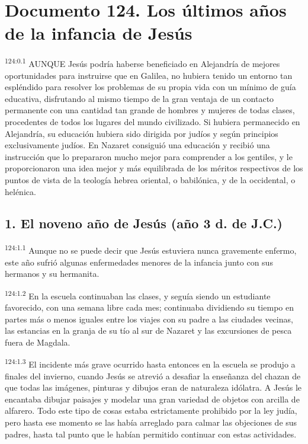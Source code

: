 \chapter{Documento 124. Los últimos años de la infancia de Jesús}
\par
\textsuperscript{124:0.1} AUNQUE Jesús podría haberse beneficiado en Alejandría de mejores oportunidades para instruirse que en Galilea, no hubiera tenido un entorno tan espléndido para resolver los problemas de su propia vida con un mínimo de guía educativa, disfrutando al mismo tiempo de la gran ventaja de un contacto permanente con una cantidad tan grande de hombres y mujeres de todas clases, procedentes de todos los lugares del mundo civilizado. Si hubiera permanecido en Alejandría, su educación hubiera sido dirigida por judíos y según principios exclusivamente judíos. En Nazaret consiguió una educación y recibió una instrucción que lo prepararon mucho mejor para comprender a los gentiles, y le proporcionaron una idea mejor y más equilibrada de los méritos respectivos de los puntos de vista de la teología hebrea oriental, o babilónica, y de la occidental, o helénica.

\section*{1. El noveno año de Jesús (año 3 d. de J.C.)}
\par
\textsuperscript{124:1.1} Aunque no se puede decir que Jesús estuviera nunca gravemente enfermo, este año sufrió algunas enfermedades menores de la infancia junto con sus hermanos y su hermanita.

\par
\textsuperscript{124:1.2} En la escuela continuaban las clases, y seguía siendo un estudiante favorecido, con una semana libre cada mes; continuaba dividiendo su tiempo en partes más o menos iguales entre los viajes con su padre a las ciudades vecinas, las estancias en la granja de su tío al sur de Nazaret y las excursiones de pesca fuera de Magdala.

\par
\textsuperscript{124:1.3} El incidente más grave ocurrido hasta entonces en la escuela se produjo a finales del invierno, cuando Jesús se atrevió a desafiar la enseñanza del chazan de que todas las imágenes, pinturas y dibujos eran de naturaleza idólatra. A Jesús le encantaba dibujar paisajes y modelar una gran variedad de objetos con arcilla de alfarero. Todo este tipo de cosas estaba estrictamente prohibido por la ley judía, pero hasta ese momento se las había arreglado para calmar las objeciones de sus padres, hasta tal punto que le habían permitido continuar con estas actividades.

